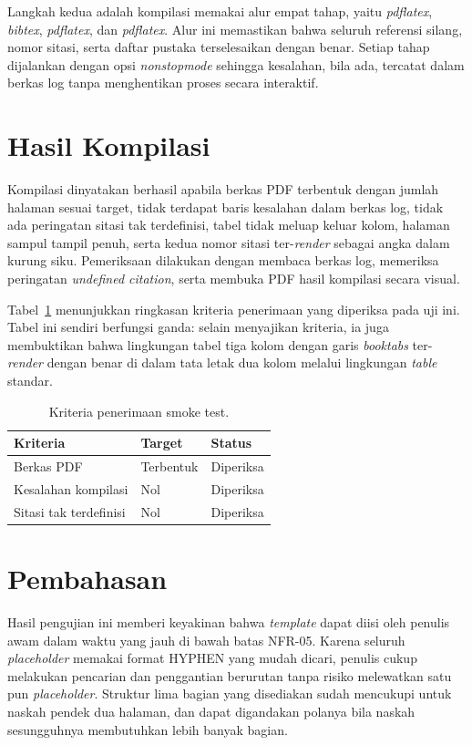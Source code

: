 \documentclass[journal]{IEEEtran}
\begin{document}
Langkah kedua adalah kompilasi memakai alur empat tahap, yaitu \textit{pdflatex}, \textit{bibtex}, \textit{pdflatex}, dan \textit{pdflatex}. Alur ini memastikan bahwa seluruh referensi silang, nomor sitasi, serta daftar pustaka terselesaikan dengan benar. Setiap tahap dijalankan dengan opsi \textit{nonstopmode} sehingga kesalahan, bila ada, tercatat dalam berkas log tanpa menghentikan proses secara interaktif.

\section{Hasil Kompilasi}

Kompilasi dinyatakan berhasil apabila berkas PDF terbentuk dengan jumlah halaman sesuai target, tidak terdapat baris kesalahan dalam berkas log, tidak ada peringatan sitasi tak terdefinisi, tabel tidak meluap keluar kolom, halaman sampul tampil penuh, serta kedua nomor sitasi ter-\textit{render} sebagai angka dalam kurung siku. Pemeriksaan dilakukan dengan membaca berkas log, memeriksa peringatan \textit{undefined citation}, serta membuka PDF hasil kompilasi secara visual.

Tabel~\ref{tab:smoke} menunjukkan ringkasan kriteria penerimaan yang diperiksa pada uji ini. Tabel ini sendiri berfungsi ganda: selain menyajikan kriteria, ia juga membuktikan bahwa lingkungan tabel tiga kolom dengan garis \textit{booktabs} ter-\textit{render} dengan benar di dalam tata letak dua kolom melalui lingkungan \textit{table} standar.

\begin{table}[htbp]
\centering
\caption{Kriteria penerimaan smoke test.}
\label{tab:smoke}
\begin{tabular}{@{}lll@{}}
\toprule
Kriteria & Target & Status \\
\midrule
Berkas PDF & Terbentuk & Diperiksa \\
Kesalahan kompilasi & Nol & Diperiksa \\
Sitasi tak terdefinisi & Nol & Diperiksa \\
\bottomrule
\end{tabular}
\end{table}

\section{Pembahasan}

Hasil pengujian ini memberi keyakinan bahwa \textit{template} dapat diisi oleh penulis awam dalam waktu yang jauh di bawah batas NFR-05. Karena seluruh \textit{placeholder} memakai format HYPHEN yang mudah dicari, penulis cukup melakukan pencarian dan penggantian berurutan tanpa risiko melewatkan satu pun \textit{placeholder}. Struktur lima bagian yang disediakan sudah mencukupi untuk naskah pendek dua halaman, dan dapat digandakan polanya bila naskah sesungguhnya membutuhkan lebih banyak bagian.
\end{document}
